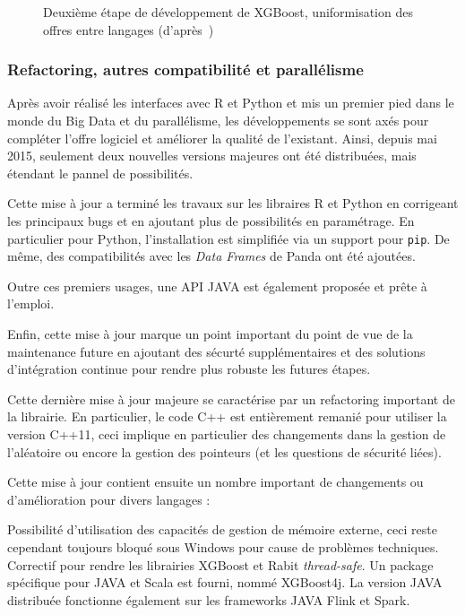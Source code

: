 \begin{figure}[h]
	\begin{margincap}
		\centering
	  	\resizebox{.98\textwidth}{!}{%
		}
		\caption{Deuxième étape de développement de XGBoost, uniformisation des offres entre langages (d'après~\cite{bib:xgboost-author})}
		\label{fig:dev_deux}
	\end{margincap}
\end{figure}

\subsubsection{Refactoring, autres compatibilité et parallélisme}
Après avoir réalisé les interfaces avec R et Python et mis un premier pied dans le monde du Big Data et du parallélisme, les développements se sont axés pour compléter l'offre logiciel et améliorer la qualité de l'existant. Ainsi, depuis mai 2015, seulement deux nouvelles versions majeures ont été distribuées, mais étendant le pannel de possibilités.

Cette mise à jour a terminé les travaux sur les libraires R et Python en corrigeant les principaux bugs et en ajoutant plus de possibilités en paramétrage. En particulier pour Python, l'installation est simplifiée via un support pour \texttt{pip}. De même, des compatibilités avec les \textit{Data Frames} de Panda ont été ajoutées.

Outre ces premiers usages, une API JAVA est également proposée et prête à l'emploi.

Enfin, cette mise à jour marque un point important du point de vue de la maintenance future en ajoutant des sécurté supplémentaires et des solutions d'intégration continue pour rendre plus robuste les futures étapes.

Cette dernière mise à jour majeure se caractérise par un refactoring important de la librairie. En particulier, le code C++ est entièrement remanié pour utiliser la version C++11, ceci implique en particulier des changements dans la gestion de l'aléatoire ou encore la gestion des pointeurs (et les questions de sécurité liées).

Cette mise à jour contient ensuite un nombre important de changements ou d'amélioration pour divers langages :
\begin{itemize}
	Possibilité d'utilisation des capacités de gestion de mémoire externe, ceci reste cependant toujours bloqué sous Windows pour cause de problèmes techniques.
	Correctif pour rendre les librairies XGBoost et Rabit \textit{thread-safe}.
	Un package spécifique pour JAVA et Scala est fourni, nommé XGBoost4j. La version JAVA distribuée fonctionne également sur les frameworks JAVA Flink et Spark.
\end{itemize}
